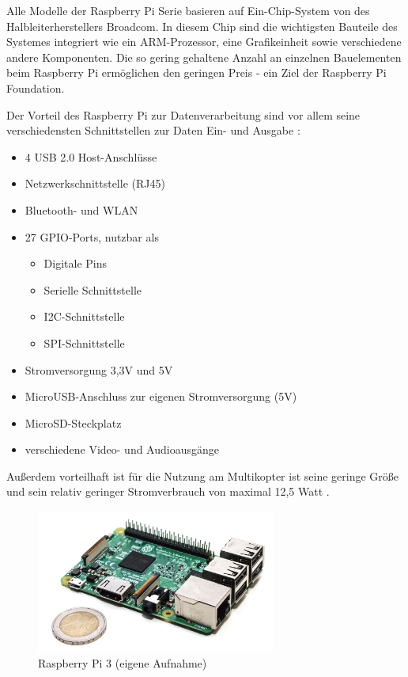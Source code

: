 \documentclass[a4paper,12pt,bibliography=totoc, listof=totoc,titlepage,pointlessnumbers]{scrreprt}
\begin{document}
Alle Modelle der Raspberry Pi Serie basieren auf Ein-Chip-System von des Halbleiterherstellers Broadcom. In diesem Chip sind die wichtigsten Bauteile des Systemes integriert wie ein ARM-Prozessor, eine Grafikeinheit sowie verschiedene andere Komponenten. Die so gering gehaltene Anzahl an einzelnen Bauelementen beim Raspberry Pi ermöglichen den geringen Preis - ein Ziel der Raspberry Pi Foundation.

Der Vorteil des Raspberry Pi zur Datenverarbeitung sind vor allem seine verschiedensten Schnittstellen zur Daten Ein- und Ausgabe \citep{raspSheet}:
\begin{itemize}
 \item 4 USB 2.0 Host-Anschlüsse
 \item Netzwerkschnittstelle (RJ45)
 \item Bluetooth- und WLAN
 \item 27 GPIO-Ports, nutzbar als \citep{ekRaspPin}
 \begin{itemize} 
  \item Digitale Pins
  \item Serielle Schnittstelle
  \item I2C-Schnittstelle
  \item SPI-Schnittstelle
 \end{itemize}
 \item Stromversorgung 3,3V und 5V
 \item MicroUSB-Anschluss zur eigenen Stromversorgung (5V)
 \item MicroSD-Steckplatz 
 \item verschiedene Video- und Audioausgänge
 \end{itemize}

Außerdem vorteilhaft ist für die Nutzung am Multikopter ist seine geringe 
Größe und sein relativ geringer Stromverbrauch von maximal 12,5 
Watt \citep{raspSheet}.

\begin{figure}
 \centering
 \includegraphics[width=0.7\textwidth]{./img/rpi3.jpg}
 \caption{Raspberry Pi 3 (eigene Aufnahme)}
 \label{img:rpi3}
\end{figure}
\end{document}
